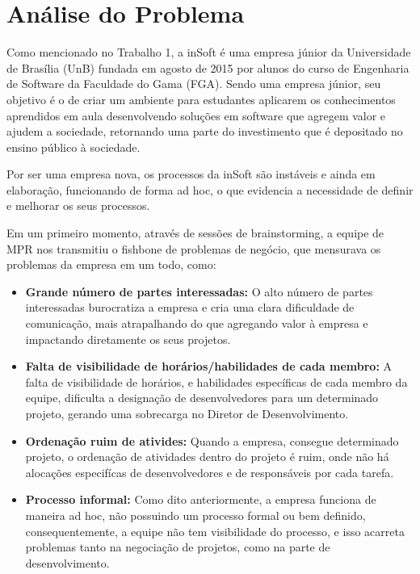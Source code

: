 \chapter{Análise do Problema}
\label{sec:prob}

Como mencionado no Trabalho 1, a inSoft é uma empresa júnior da Universidade de Brasília (UnB) fundada em agosto de 2015 por alunos do curso de Engenharia de Software da Faculdade do Gama (FGA). Sendo uma empresa júnior, seu objetivo é o de criar um ambiente para estudantes aplicarem os conhecimentos aprendidos em aula desenvolvendo soluções em software que agregem valor e ajudem a sociedade, retornando uma parte do investimento que é depositado no ensino público à sociedade.

Por ser uma empresa nova, os processos da inSoft são instáveis e ainda em elaboração, funcionando de forma ad hoc, o que evidencia a necessidade de definir e melhorar os seus processos.

Em um primeiro momento, através de sessões de brainstorming, a equipe de MPR nos transmitiu o fishbone de problemas de negócio, que mensurava os problemas da empresa em um todo, como:

\begin{itemize}
  \item \textbf{Grande número de partes interessadas:}
  O alto número de partes interessadas burocratiza a empresa e cria uma clara dificuldade de comunicação, mais atrapalhando do que agregando valor à empresa e impactando diretamente os seus projetos.
\end{itemize}


\begin{itemize}
  \item \textbf{Falta de visibilidade de horários/habilidades de cada membro:}
  A falta de visibilidade de horários, e habilidades específicas de cada membro da equipe, dificulta a designação de desenvolvedores para um determinado projeto, gerando uma sobrecarga no Diretor de Desenvolvimento.
\end{itemize}

\begin{itemize}
  \item \textbf{Ordenação ruim de ativides:}
  Quando a empresa, consegue determinado projeto, o ordenação de atividades dentro do projeto é ruim, onde não há alocações especifícas de desenvolvedores e de responsáveis por cada tarefa.
\end{itemize}

\begin{itemize}
  \item \textbf{Processo informal:}
  Como dito anteriormente, a empresa funciona de maneira ad hoc, não possuindo um processo formal ou bem definido, consequentemente, a equipe não tem visibilidade do processo, e isso acarreta problemas tanto na negociação de projetos, como na parte de desenvolvimento.
\end{itemize}

